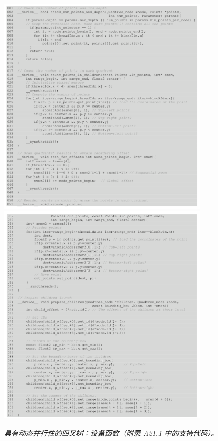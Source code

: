 \begin{figure}[H]
	\centering
	\includegraphics[width=0.9\textwidth]{figs/F21.11-1.png}
	\includegraphics[width=0.9\textwidth]{figs/F21.11-2.png}
	\caption{\textit{具有动态并行性的四叉树：设备函数（附录 A21.1 中的支持代码）。}}
\end{figure}

